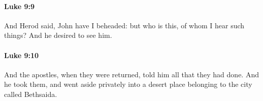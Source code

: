 		\paragraph{Luke 9:9} %
			\label{LUKE-9-9}

			And Herod said, John have I beheaded: but who is this, of whom I hear such things? And he desired to see him.

			\begin{framed}
			\scriptsize
				\begin{compactdesc}
					\item[SBLG] 
				\end{compactdesc}
			\end{framed}

		\paragraph{Luke 9:10} %
			\label{LUKE-9-10}

			And the apostles, when they were returned, told him all that they had done. And he took them, and went aside privately into a desert place belonging to the city called Bethsaida.

